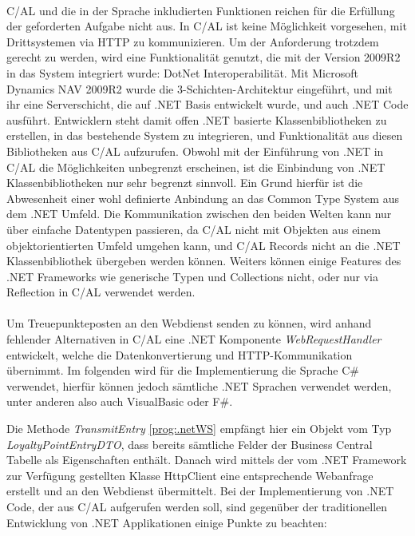 \paragraph{}

C/AL und die in der Sprache inkludierten Funktionen reichen für die Erfüllung der geforderten Aufgabe nicht aus. In C/AL ist keine Möglichkeit vorgesehen, mit Drittsystemen via HTTP zu kommunizieren. Um der Anforderung trotzdem gerecht zu werden, wird eine Funktionalität genutzt, die mit der Version 2009R2 in das System integriert wurde: DotNet Interoperabilität. Mit Microsoft Dynamics NAV 2009R2 wurde die 3-Schichten-Architektur eingeführt, und mit ihr eine Serverschicht, die auf .NET Basis entwickelt wurde, und auch .NET Code ausführt. Entwicklern steht damit offen .NET basierte Klassenbibliotheken zu erstellen, in das bestehende System zu integrieren, und Funktionalität aus diesen Bibliotheken aus C/AL aufzurufen. Obwohl mit der Einführung von .NET in C/AL die Möglichkeiten unbegrenzt erscheinen, ist die Einbindung von .NET Klassenbibliotheken nur sehr begrenzt sinnvoll. Ein Grund hierfür ist die Abwesenheit einer wohl definierte Anbindung an das Common Type System aus dem .NET Umfeld. Die Kommunikation zwischen den beiden Welten kann nur über einfache Datentypen passieren, da C/AL nicht mit Objekten aus einem objektorientierten Umfeld umgehen kann, und C/AL Records nicht an die .NET Klassenbibliothek übergeben werden können. Weiters können einige Features des .NET Frameworks wie generische Typen und Collections nicht, oder nur via Reflection in C/AL verwendet werden. 
\paragraph{}

Um Treuepunkteposten an den Webdienst senden zu können, wird anhand fehlender Alternativen in C/AL eine .NET Komponente \textit{WebRequestHandler} entwickelt, welche die Datenkonvertierung und HTTP-Kommunikation übernimmt. Im folgenden wird für die Implementierung die Sprache C\# verwendet, hierfür können jedoch sämtliche .NET Sprachen verwendet werden, unter anderen also auch VisualBasic oder F\#.
\pagebreak

Die Methode \textit{TransmitEntry} \ref{prog:.netWS} empfängt hier ein Objekt vom Typ \textit{LoyaltyPointEntryDTO}, dass bereits sämtliche Felder der Business Central Tabelle als Eigenschaften enthält. Danach wird mittels der vom .NET Framework zur Verfügung gestellten Klasse HttpClient eine entsprechende Webanfrage erstellt und an den Webdienst übermittelt. Bei der Implementierung von .NET Code, der aus C/AL aufgerufen werden soll, sind gegenüber der traditionellen Entwicklung von .NET Applikationen einige Punkte zu beachten:

